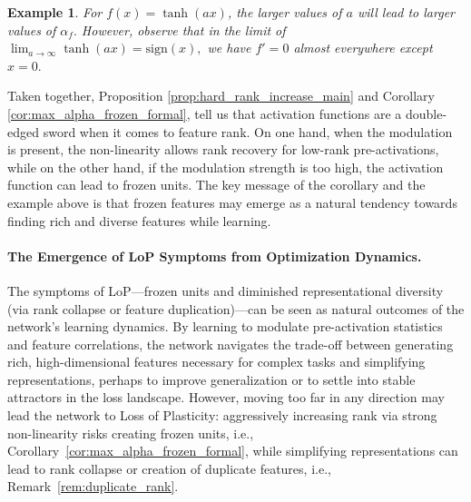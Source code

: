 \documentclass{article}
\newcommand{\GIU}[1]{\todo[color=purple!30,size=\tiny]{GIU: #1}}
\newtheorem{example}{Example}[section] %
\numberwithin{figure}{section}
\begin{document}
\begin{example}
For $f(x) = \tanh(ax)$, the larger values of $a$ will lead to larger values of $\alpha_f.$ However, observe that in the limit of $\lim_{a \to \infty} \tanh(a x) = \text{sign}(x),$ we have $f'=0$ almost everywhere except $x=0.$ 
\end{example}

Taken together, Proposition \ref{prop:hard_rank_increase_main} and Corollary \ref{cor:max_alpha_frozen_formal}, tell us that activation functions are a double-edged sword when it comes to feature rank. On one hand, when the modulation is present, the non-linearity allows rank recovery for low-rank pre-activations, while on the other hand, if the modulation strength  is too high, the activation function can lead to frozen units.   
The key message of the corollary and the example above is  that frozen features may emerge as a natural tendency towards finding rich and diverse features while learning. 

\paragraph{The Emergence of LoP Symptoms from Optimization Dynamics.} The symptoms of LoP---frozen units and diminished representational diversity (via rank collapse or feature duplication)---can be seen as natural outcomes of the network's learning dynamics. By learning to modulate pre-activation statistics and feature correlations, the network navigates the trade-off between generating rich, high-dimensional features necessary for complex tasks and simplifying representations, perhaps to improve generalization or to settle into stable attractors in the loss landscape.  However, moving too far in any direction may lead the network to Loss of Plasticity: aggressively increasing rank via strong non-linearity risks creating frozen units, i.e., Corollary~\ref{cor:max_alpha_frozen_formal}, while simplifying representations can lead to rank collapse or creation of duplicate features, i.e., Remark~\ref{rem:duplicate_rank}.
\end{document}
